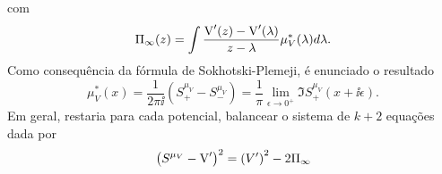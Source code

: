 com $$\Pi_{\infty}(z) = \int \frac{\operatorname{V}'(z) - \operatorname{V}'(\lambda)}{z - \lambda} \mu^*_V(\lambda) d\lambda.$$ Como consequência da fórmula de Sokhotski-Plemeji, é enunciado o resultado 
\begin{equation}
	\mu^{*}_{V}(x) = \frac{1}{2\pi \ii} \left( S^{\mu_V}_{+} -  S^{\mu_V}_{-}\right) = \frac{1}{\pi} \lim_{\epsilon \to 0^+} \Im{S^{\mu_V}_{+}(x + \ii\epsilon)}.
	\label{Equation: p(lambda)}
\end{equation}
Em geral, restaria para cada potencial, balancear o sistema de $k+2$ equações dada por
\[
\left( S^{\mu_{V}} - \operatorname{V}' \right)^2 = \left( V' \right)^2 - 2 \Pi_{\infty}
\]



